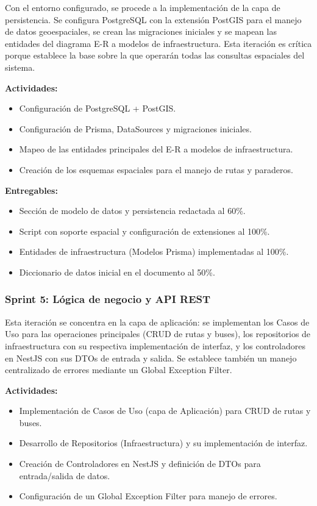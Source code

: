 Con el entorno configurado, se procede a la implementación de la capa de persistencia. Se configura PostgreSQL con la extensión PostGIS para el manejo de datos geoespaciales, se crean las migraciones iniciales y se mapean las entidades del diagrama E-R a modelos de infraestructura. Esta iteración es crítica porque establece la base sobre la que operarán todas las consultas espaciales del sistema.

\textbf{Actividades:}
\begin{itemize}
    \item Configuración de PostgreSQL + PostGIS.
    \item Configuración de Prisma, DataSources y migraciones iniciales.
    \item Mapeo de las entidades principales del E-R a modelos de infraestructura.
    \item Creación de los esquemas espaciales para el manejo de rutas y paraderos.
\end{itemize}

\textbf{Entregables:}
\begin{itemize}
    \item Sección de modelo de datos y persistencia redactada al 60\%.
    \item Script con soporte espacial y configuración de extensiones al 100\%.
    \item Entidades de infraestructura (Modelos Prisma) implementadas al 100\%.
    \item Diccionario de datos inicial en el documento al 50\%.
\end{itemize}

\subsubsection{Sprint 5: Lógica de negocio y API REST}

Esta iteración se concentra en la capa de aplicación: se implementan los Casos de Uso para las operaciones principales (CRUD de rutas y buses), los repositorios de infraestructura con su respectiva implementación de interfaz, y los controladores en NestJS con sus DTOs de entrada y salida. Se establece también un manejo centralizado de errores mediante un Global Exception Filter.

\textbf{Actividades:}
\begin{itemize}
    \item Implementación de Casos de Uso (capa de Aplicación) para CRUD de rutas y buses.
    \item Desarrollo de Repositorios (Infraestructura) y su implementación de interfaz.
    \item Creación de Controladores en NestJS y definición de DTOs para entrada/salida de datos.
    \item Configuración de un Global Exception Filter para manejo de errores.
\end{itemize}

